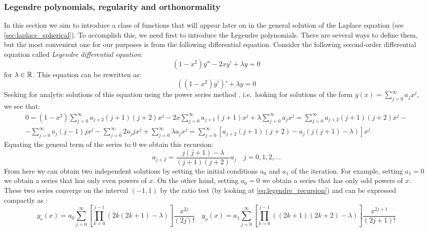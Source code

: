 \documentclass[../main.tex]{subfiles}
\begin{document}
\subsubsection{Legendre polynomials, regularity and orthonormality}
In this section we aim to introduce a class of functions that will appear later on in the general solution of the Laplace equation (see \cref{sec:laplace_spherical}). To accomplish this, we need first to introduce the Legendre polynomials. There are several ways to define them, but the most convenient one for our purposes is from the following differential equation. Consider the following second-order differential equation called \emph{Legendre differential equation}:
\begin{equation}
  (1-x^2)y''-2xy'+\lambda y=0
\end{equation}
for $\lambda\in\mathbb{R}$. This equation can be rewritten as:
\begin{equation}\label{eq:legendre_diff_eq}
  {((1-x^2)y')}'+\lambda  y=0
\end{equation}
Seeking for analytic solutions of this equation using the power series method \cite{florida:legendre}, i.e.\ looking for solutions of the form $y(x)=\sum_{j=0}^{\infty}a_jx^j$, we see that:
\begin{multline}
  0=(1-x^2)\sum_{j=0}^{\infty}a_{j+2}(j+1)(j+2)x^j-2x\sum_{j=0}^{\infty}a_{j+1}(j+1)x^j+\lambda\sum_{j=0}^{\infty}a_jx^j =\sum_{j=0}^{\infty}a_{j+2}(j+1)(j+2)x^j-\\-\sum_{j=0}^{\infty}a_{j}(j-1)jx^{j}-\sum_{j=0}^{\infty}2a_{j}jx^{j}+\sum_{j=0}^{\infty}\lambda a_jx^j  =\sum_{j=0}^{\infty}[a_{j+2}(j+1)(j+2) - a_j(j(j+1)-\lambda)]x^j
\end{multline}
Equating the general term of the series to 0 we obtain this recursion:
\begin{equation}\label{eq:legendre_recursion}
  a_{j+2}=\frac{j(j+1)-\lambda}{(j+1)(j+2)}a_j\quad j=0,1,2,\ldots
\end{equation}
From here we can obtain two independent solutions by setting the initial conditions $a_0$ and $a_1$ of the iteration. For example, setting $a_1=0$ we obtain a series that has only even powers of $x$. On the other hand, setting $a_0=0$ we obtain a series that has only odd powers of $x$. These two series converge on the interval $(-1,1)$ by the ratio test (by looking at \cref{eq:legendre_recursion}) and can be expressed compactly as \cite{florida:legendre}:
\begin{equation}\label{eq:legendre_series}
  y_\mathrm{e}(x)=a_0\sum_{j=0}^{\infty}\left[\prod_{k=0}^{j-1}(2k(2k+1)-\lambda)\right]\frac{x^{2j}}{(2j)!}\quad y_\mathrm{o}(x)=a_1\sum_{j=0}^{\infty}\left[\prod_{k=0}^{j-1}((2k+1)(2k+2)-\lambda)\right]\frac{x^{2j+1}}{(2j+1)!}
\end{equation}
\end{document}
